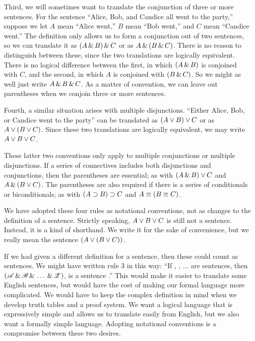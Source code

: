 Third, we will sometimes want to translate the conjunction of three or more sentences. For the sentence ``Alice, Bob, and Candice all went to the party,'' suppose we let $A$ mean ``Alice went,'' $B$ mean ``Bob went,'' and $C$ mean ``Candice went.'' The definition only allows us to form a conjunction out of two sentences, so we can translate it as $(A \,\&\, B) \,\&\, C$ or as $A \,\&\, (B \,\&\, C)$. There is no reason to distinguish between these, since the two translations are logically equivalent. There is no logical difference between the first, in which $(A \,\&\, B)$ is conjoined with $C$, and the second, in which $A$ is conjoined with $(B \,\&\, C)$.  So we might as well just write $A \,\&\, B \,\&\, C$. As a matter of convention, we can leave out parentheses when we conjoin three or more sentences.

Fourth, a similar situation arises with multiple disjunctions. ``Either Alice, Bob, or Candice went to the party'' can be translated as $(A \vee B) \vee C$ or as $A \vee (B \vee C)$. Since these two translations are logically equivalent, we may write $A \vee B \vee C$.

These latter two conventions only apply to multiple conjunctions or multiple  disjunctions. If a series of connectives includes both disjunctions and conjunctions, then the parentheses are essential; as with $(A \,\&\, B) \vee C$ and $A \,\&\, (B \vee C)$. The parentheses are also required if there is a series of conditionals or biconditionals; as with $(A \supset B) \supset C$ and $A \equiv (B \equiv C)$.

We have adopted these four rules as notational conventions, not as changes to the definition of a sentence. Strictly speaking, $A \vee B \vee C$ is still not a sentence. Instead, it is a kind of shorthand. We write it for the sake of convenience, but we really mean the sentence $(A \vee (B \vee C))$.

If we had given a different definition for a sentence, then these could count as sentences. We might have written rule 3 in this way: ``If , , $\ldots$  are sentences, then $(\mathscr{A}\,\&\,\mathscr{B}\,\&\,\ldots\,\&\,\mathscr{Z})$, is a sentence .'' This would make it easier to translate some English sentences, but would have the cost of making our formal language more complicated. We would have to keep the complex definition in mind when we develop truth tables and a proof system. We want a logical language that is expressively simple and allows us to translate easily from English, but we also want a formally simple language. Adopting notational conventions is a compromise between these two desires.


